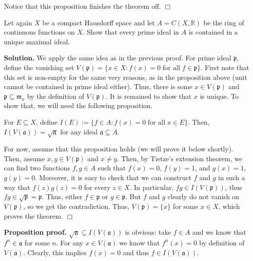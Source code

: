 \documentclass{template}
\newcommand{\qedwhite}{\hfill \ensuremath{\Box}}
\begin{document}
Notice that this proposition finishes the theorem off. \qedwhite

\begin{problem}[Exercise 5]
    Let again $X$ be a compact Hausdorff space and let $A=C(X,\mathbb{R})$ be
the ring of continuous functions on $X$. Show that every prime ideal in $A$ is
contained in a unique maximal ideal.
\end{problem}

\textbf{Solution.} We apply the same idea as in the previous proof. For prime
ideal $\mathfrak{p}$, define the vanishing set $V(\mathfrak{p}) = \{x \in X:
f(x)=0 \; \text{for all} \; f \in \mathfrak{p}\}$. First note that this set is
non-empty for the same very reasons, as in the proposition above (unit cannot be
contained in prime ideal either). Thus, there is some $x \in V(\mathfrak{p})$
and $\mathfrak{p} \subseteq \mathfrak{m}_x$ by the definition of
$V(\mathfrak{p})$. It is remained to show that $x$ is unique. To show that, we
will need the following proposition.
\begin{propositions}
    For $E \subseteq X$, define $I(E) := \{f \in A: f(x) = 0 \; \text{for all}
    \; x \in E\}$. Then, $I(V(\mathfrak{a})) = \sqrt{\mathfrak{a}}$ for any
    ideal $\mathfrak{a} \subseteq A$.
\end{propositions}

For now, assume that this proposition holds (we will prove it below shortly).
Then, assume $x,y \in V(\mathfrak{p})$ and $x \neq y$. Then, by Tietze’s
extension theorem, we can find two functions $f,g \in A$ such that $f(x)=0$,
$f(y)=1$, and $g(x)=1$, $g(y)=0$. Moreover, it is easy to check that we can
construct $f$ and $g$ in such a way that $f(z)g(z)=0$ for every $z \in X$. In
particular, $fg \in I(V(\mathfrak{p}))$, thus $fg \in
\sqrt{\mathfrak{p}}=\mathfrak{p}$. Thus, either $f \in \mathfrak{p}$ or $g \in
\mathfrak{p}$. But $f$ and $g$ clearly do not vanish on $V(\mathfrak{p})$, so we
get the contradiction. Thus, $V(\mathfrak{p})=\{x\}$ for some $x \in X$, which
proves the theorem. \qedwhite

\textbf{Proposition proof.} $\sqrt{\mathfrak{a}} \subseteq I(V(\mathfrak{a}))$
is obvious: take $f \in A$ and we know that $f^n \in \mathfrak{a}$ for some $n$.
For any $x \in V(\mathfrak{a})$ we know that $f^n(x)=0$ by definition of
$V(\mathfrak{a})$. Clearly, this implies $f(x)=0$ and thus $f \in
I(V(\mathfrak{a}))$.
\end{document}
